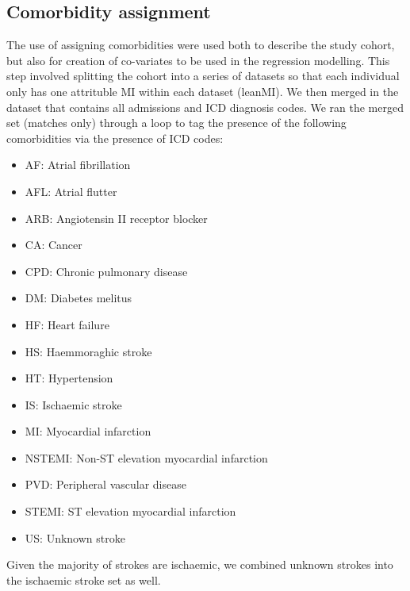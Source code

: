\documentclass[11pt]{article}
\begin{document}
\subsection{Comorbidity assignment}
The use of assigning comorbidities were used both to describe the study cohort, but also for creation of co-variates to be used in the regression modelling. 
This step involved splitting the cohort into a series of datasets so that each individual only has one attrituble MI within each dataset (leanMI). We then merged in the dataset that contains all admissions and ICD diagnosis codes. We ran the merged set (matches only) through a loop to tag the presence of the following comorbidities via the presence of ICD codes:
\begin{itemize}
\item AF: Atrial fibrillation
\item AFL: Atrial flutter
\item ARB: Angiotensin II receptor blocker
\item CA: Cancer
\item CPD: Chronic pulmonary disease
\item DM: Diabetes melitus
\item HF: Heart failure
\item HS: Haemmoraghic stroke
\item HT: Hypertension
\item IS: Ischaemic stroke
\item MI: Myocardial infarction
\item NSTEMI: Non-ST elevation myocardial infarction
\item PVD: Peripheral vascular disease
\item STEMI: ST elevation myocardial infarction
\item US: Unknown stroke
\end{itemize}

Given the majority of strokes are ischaemic, we combined unknown strokes into the ischaemic stroke set as well. 
\color{violet}
\begin{stlog}\end{stlog}
\color{black}
\end{document}
